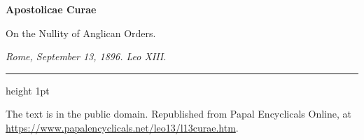 \documentclass[11pt,letterpaper]{article}
\begin{document}
\color{ink}
\begin{center}
{\LARGE\bfseries\color{heading} Apostolicae Curae\par}
\vspace{1em}
{\large On the Nullity of Anglican Orders.\par}
\vspace{0.6em}
{\itshape\color{subhead} Rome, September 13, 1896. Leo XIII.\par}
\vspace{0.4em}
{\color{accent}\hrule height 1pt}
\end{center}
\vspace{1em}



\vspace{2em}
{\small\noindent The text is in the public domain. Republished from Papal Encyclicals Online,
at \url{https://www.papalencyclicals.net/leo13/l13curae.htm}.\par}
\end{document}
